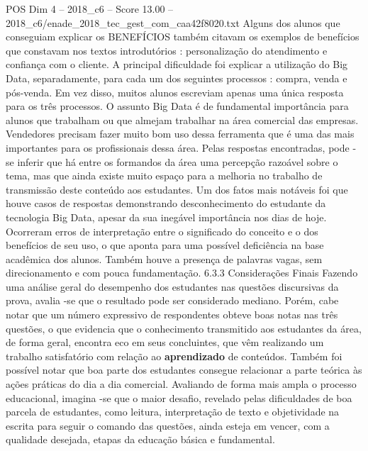 \begin{textsample}{POS Dim 4 – 2018\_c6 – Score 13.00 – 2018\_c6/enade\_2018\_tec\_gest\_com\_caa42f8020.txt}
Alguns dos alunos que conseguiam explicar os BENEFÍCIOS também citavam os exemplos de benefícios que constavam nos textos introdutórios : personalização do atendimento e confiança com o cliente.
A principal dificuldade foi explicar a utilização do Big Data, separadamente, para cada um dos seguintes processos : compra, venda e pós-venda.
Em vez disso, muitos alunos escreviam apenas uma única resposta para os três processos.
O assunto Big Data é de fundamental importância para alunos que trabalham ou que almejam trabalhar na área comercial das empresas.
Vendedores precisam fazer muito bom uso dessa ferramenta que é uma das mais importantes para os profissionais dessa área.
Pelas respostas encontradas, pode -se inferir que há entre os formandos da área uma percepção razoável sobre o tema, mas que ainda existe muito espaço para a melhoria no trabalho de transmissão deste conteúdo aos estudantes.
Um dos fatos mais notáveis foi que houve casos de respostas demonstrando desconhecimento do estudante da tecnologia Big Data, apesar da sua inegável importância nos dias de hoje.
Ocorreram erros de interpretação entre o significado do conceito e o dos benefícios de seu uso, o que aponta para uma possível deficiência na base acadêmica dos alunos.
Também houve a presença de palavras vagas, sem direcionamento e com pouca fundamentação. 6.3.3 Considerações Finais Fazendo uma análise geral do desempenho dos estudantes nas questões discursivas da prova, avalia -se que o resultado pode ser considerado mediano.
Porém, cabe notar que um número expressivo de respondentes obteve boas notas nas três questões, o que evidencia que o conhecimento transmitido aos estudantes da área, de forma geral, encontra eco em seus concluintes, que vêm realizando um trabalho satisfatório com relação ao \textbf{aprendizado} de conteúdos.
Também foi possível notar que boa parte dos estudantes consegue relacionar a parte teórica às ações práticas do dia a dia comercial.
Avaliando de forma mais ampla o processo educacional, imagina -se que o maior desafio, revelado pelas dificuldades de boa parcela de estudantes, como leitura, interpretação de texto e objetividade na escrita para seguir o comando das questões, ainda esteja em vencer, com a qualidade desejada, etapas da educação básica e fundamental.

\end{textsample}
